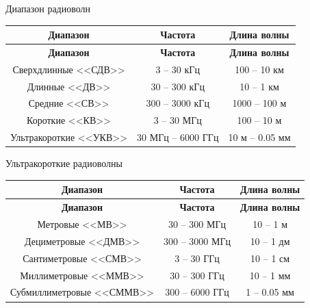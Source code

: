 \begin{frame}{Диапазон радиоволн}
    \centering
    \begin{longtable}[c]{|c|c|c|}
        \hline
        \textbf{Диапазон} & \textbf{Частота} & \textbf{Длина волны}\\
        \hline
        \endfirsthead
        \hline
        \textbf{Диапазон} & \textbf{Частота} & \textbf{Длина волны}\\
        \hline
        \endhead
            Сверхдлинные <<СДВ>> & 3 -- 30 кГц & 100 -- 10 км\\
            \hline
            Длинные <<ДВ>> & 30 -- 300 кГц & 10 -- 1 км\\
            \hline
            Средние <<СВ>> & 300 -- 3000 кГц & 1000 -- 100 м\\
            \hline
            Короткие <<КВ>> & 3 -- 30 МГц & 100 -- 10 м\\
            \hline
            Ультракороткие <<УКВ>> & 30 МГц -- 6000 ГГц & 10 м -- 0.05 мм\\
            \hline
    \end{longtable}

    Ультракороткие радиоволны

    \begin{longtable}[c]{|c|c|c|}
        \hline
        \textbf{Диапазон} & \textbf{Частота} & \textbf{Длина волны}\\
        \hline
        \endfirsthead
        \hline
        \textbf{Диапазон} & \textbf{Частота} & \textbf{Длина волны}\\
        \hline
        \endhead
            Метровые <<МВ>> & 30 -- 300 МГц & 10 -- 1 м\\
            \hline
            Дециметровые <<ДМВ>> & 300 -- 3000 МГц & 10 -- 1 дм\\
            \hline
            Сантиметровые <<СМВ>> & 3 -- 30 ГГц & 10 -- 1 см\\
            \hline
            Миллиметровые <<ММВ>> & 30 -- 300 ГГц & 10 -- 1 мм\\
            \hline
            Субмиллиметровые <<СММВ>> & 300 -- 6000 ГГц & 1 -- 0.05 мм\\
            \hline
    \end{longtable}
\end{frame}

